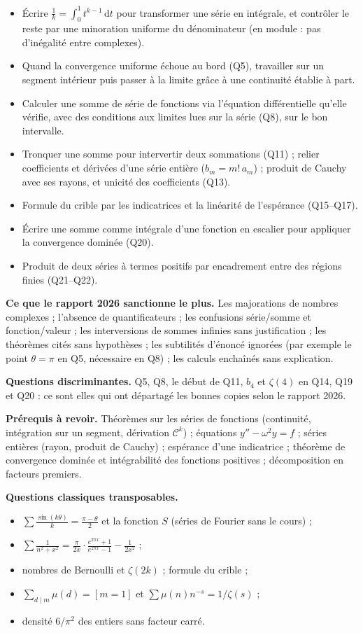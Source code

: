 \documentclass[11pt,a4paper]{article}
\providecommand{\tightlist}{\setlength{\itemsep}{0pt}\setlength{\parskip}{0pt}}
\begin{document}
\begin{itemize}
\tightlist
\item
  Écrire \(\frac1k=\int_0^1t^{k-1}\,\mathrm{d}t\) pour transformer une série en intégrale, et contrôler le reste par une minoration uniforme du dénominateur (en module : pas d'inégalité entre complexes).
\item
  Quand la convergence uniforme échoue au bord (Q5), travailler sur un segment intérieur puis passer à la limite grâce à une continuité établie à part.
\item
  Calculer une somme de série de fonctions via l'équation différentielle qu'elle vérifie, avec des conditions aux limites lues sur la série (Q8), sur le bon intervalle.
\item
  Tronquer une somme pour intervertir deux sommations (Q11) ; relier coefficients et dérivées d'une série entière (\(b_m=m!\,a_m\)) ; produit de Cauchy avec ses rayons, et unicité des coefficients (Q13).
\item
  Formule du crible par les indicatrices et la linéarité de l'espérance (Q15--Q17).
\item
  Écrire une somme comme intégrale d'une fonction en escalier pour appliquer la convergence dominée (Q20).
\item
  Produit de deux séries à termes positifs par encadrement entre des régions finies (Q21--Q22).
\end{itemize}

\textbf{Ce que le rapport 2026 sanctionne le plus.} Les majorations de nombres complexes ; l'absence de quantificateurs ; les confusions série/somme et fonction/valeur ; les interversions de sommes infinies sans justification ; les théorèmes cités sans hypothèses ; les subtilités d'énoncé ignorées (par exemple le point \(\theta=\pi\) en Q5, nécessaire en Q8) ; les calculs enchaînés sans explication.

\textbf{Questions discriminantes.} Q5, Q8, le début de Q11, \(b_4\) et \(\zeta(4)\) en Q14, Q19 et Q20 : ce sont elles qui ont départagé les bonnes copies selon le rapport 2026.

\textbf{Prérequis à revoir.} Théorèmes sur les séries de fonctions (continuité, intégration sur un segment, dérivation \(\mathcal C^k\)) ; équations \(y''-\omega^2y=f\) ; séries entières (rayon, produit de Cauchy) ; espérance d'une indicatrice ; théorème de convergence dominée et intégrabilité des fonctions positives ; décomposition en facteurs premiers.

\textbf{Questions classiques transposables.}

\begin{itemize}
\tightlist
\item
  \(\sum\frac{\sin(k\theta)}{k}=\frac{\pi-\theta}{2}\) et la fonction \(S\) (séries de Fourier sans le cours) ;
\item
  \(\sum\frac{1}{n^2+x^2}=\frac{\pi}{2x}\cdot\frac{e^{2\pi x}+1}{e^{2\pi x}-1}-\frac{1}{2x^2}\) ;
\item
  nombres de Bernoulli et \(\zeta(2k)\) ; formule du crible ;
\item
  \(\sum_{d\mid m}\mu(d)=[m=1]\) et \(\sum\mu(n)n^{-s}=1/\zeta(s)\) ;
\item
  densité \(6/\pi^2\) des entiers sans facteur carré.
\end{itemize}
\end{document}
